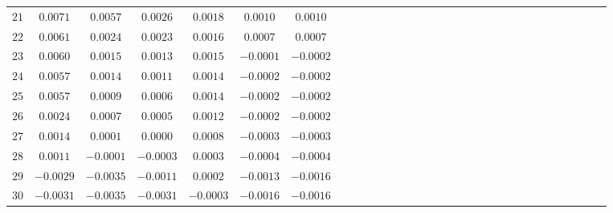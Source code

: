 \begin{table}[!htbp]
\begin{tabular}{c c c c c c c c c c c c c c c c c c c c c c c c c c c c c c c }
$21$ &$  0.0071$&$ 0.0057$&$ 0.0026$&$ 0.0018$&$ 0.0010$&$ 0.0010$\\
$22$&$    0.0061$&$ 0.0024$&$0.0023$&$0.0016$&$0.0007$&$0.0007$\\
$23$ &$   0.0060$&$ 0.0015$&$ 0.0013$&$0.0015$&$-0.0001$&$-0.0002$\\
$24$  &$  0.0057$&$ 0.0014$&$ 0.0011$&$0.0014$&$-0.0002$&$-0.0002$\\
$25$   &$ 0.0057$&$ 0.0009$&$ 0.0006$&$0.0014$&$-0.0002$&$-0.0002$\\
$26$    &$0.0024$&$ 0.0007$&$ 0.0005$&$0.0012$&$-0.0002$&$-0.0002$\\
$27$&$    0.0014$&$ 0.0001$&$ 0.0000$&$0.0008$&$-0.0003$&$-0.0003$\\
$28$&$    0.0011$&$ -0.0001$&$-0.0003$&$0.0003$&$-0.0004$&$-0.0004$\\
$29$ &$  -0.0029$&$-0.0035$&$-0.0011$&$0.0002$&$-0.0013$&$-0.0016$\\
$ 30$ &$ -0.0031$&$-0.0035$&$-0.0031$&$-0.0003$&$-0.0016$&$-0.0016$\\
    \hline 

\end{tabular}
\end{table}


